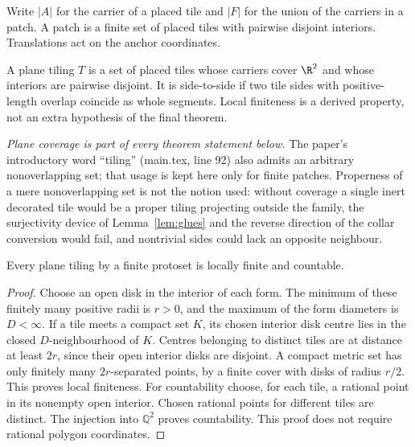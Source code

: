 \begin{definition}\label{def:placed}
Write $|A|$ for the carrier of a placed tile and $|F|$ for the union of the
carriers in a patch. A patch is a finite set of placed tiles with pairwise
disjoint interiors. Translations act on the anchor coordinates.
\end{definition}

\begin{definition}\label{def:tiling}
A plane tiling $T$ is a set of placed tiles whose carriers cover $\R^2$ and
whose interiors are pairwise disjoint. It is side-to-side if two tile sides
with positive-length overlap coincide as whole segments. Local finiteness
is a derived property, not an extra hypothesis of the final theorem.

\emph{Plane coverage is part of every theorem statement below.} The
paper's introductory word ``tiling'' (main.tex, line 92) also admits an
arbitrary nonoverlapping set; that usage is kept here only for finite
patches. Properness of a mere nonoverlapping set is not the notion used:
without coverage a single inert decorated tile would be a proper tiling
projecting outside the family, the surjectivity device of
Lemma~\ref{lem:glues} and the reverse direction of the collar conversion
would fail, and nontrivial sides could lack an opposite neighbour.
\end{definition}

\begin{lemma}\label{lem:localfinite}
Every plane tiling by a finite protoset is locally finite and countable.
\end{lemma}
\begin{proof}
Choose an open disk in the interior of each form. The minimum of these
finitely many positive radii is $r>0$, and the maximum of the form diameters
is $D<\infty$. If a tile meets a compact set $K$, its chosen interior disk
centre lies in the closed $D$-neighbourhood of $K$. Centres belonging to
distinct tiles are at distance at least $2r$, since their open interior
disks are disjoint. A compact metric set has only finitely many
$2r$-separated points, by a finite cover with disks of radius $r/2$.
This proves local finiteness.
For countability choose, for each tile, a rational point in its nonempty
open interior. Chosen rational points for different tiles are distinct.
The injection into $\mathbb Q^2$ proves countability. This proof does not
require rational polygon coordinates.
\end{proof}


